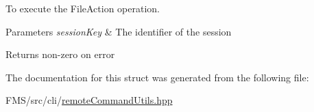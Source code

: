 To execute the FileAction operation. 


\begin{DoxyParams}{Parameters}
{\em sessionKey} & The identifier of the session \\
\hline
\end{DoxyParams}
\begin{DoxyReturn}{Returns}
non-\/zero on error 
\end{DoxyReturn}


The documentation for this struct was generated from the following file:\begin{DoxyCompactItemize}
\item 
FMS/src/cli/\hyperlink{remoteCommandUtils_8hpp}{remoteCommandUtils.hpp}\end{DoxyCompactItemize}
